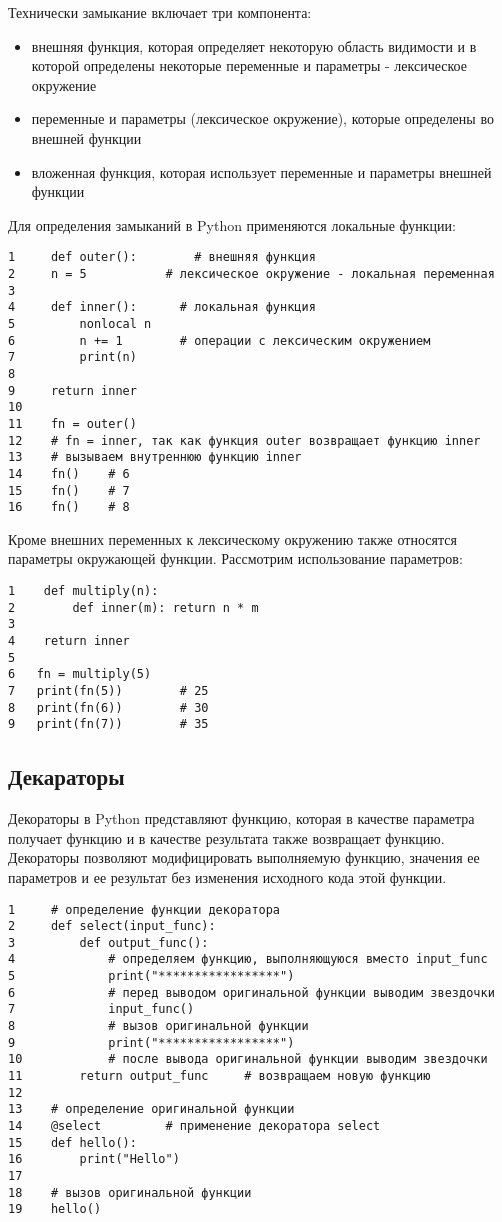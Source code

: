 \documentclass[12pt, a4paper]{article}
\begin{document}
Технически замыкание включает три компонента:

\begin{itemize}
    \item внешняя функция, которая определяет некоторую область видимости и в которой определены некоторые переменные и параметры - лексическое окружение
    \item переменные и параметры (лексическое окружение), которые определены во внешней функции
    \item вложенная функция, которая использует переменные и параметры внешней функции
\end{itemize}

Для определения замыканий в Python применяются локальные функции:

\begin{verbatim}
1     def outer():        # внешняя функция
2     n = 5           # лексическое окружение - локальная переменная
3  
4     def inner():      # локальная функция
5         nonlocal n
6         n += 1        # операции с лексическим окружением
7         print(n)
8  
9     return inner 
10 
11    fn = outer()   
12    # fn = inner, так как функция outer возвращает функцию inner
13    # вызываем внутреннюю функцию inner
14    fn()    # 6
15    fn()    # 7
16    fn()    # 8
\end{verbatim}

Кроме внешних переменных к лексическому окружению также относятся параметры окружающей функции. Рассмотрим использование параметров:

\begin{verbatim}
1    def multiply(n):
2        def inner(m): return n * m
3 
4    return inner
5 
6   fn = multiply(5)
7   print(fn(5))        # 25
8   print(fn(6))        # 30
9   print(fn(7))        # 35
\end{verbatim}

\subsection{Декараторы}

Декораторы в Python представляют функцию, которая в качестве параметра получает функцию и в качестве результата также возвращает функцию. Декораторы позволяют модифицировать выполняемую функцию, значения ее параметров и ее результат без изменения исходного кода этой функции.

\begin{verbatim}
1     # определение функции декоратора
2     def select(input_func):    
3         def output_func():      
4             # определяем функцию, выполняющуюся вместо input_func
5             print("*****************")  
6             # перед выводом оригинальной функции выводим звездочки
7             input_func()                
8             # вызов оригинальной функции
9             print("*****************")  
10            # после вывода оригинальной функции выводим звездочки
11        return output_func     # возвращаем новую функцию
12 
13    # определение оригинальной функции
14    @select         # применение декоратора select
15    def hello():
16        print("Hello")
17 
18    # вызов оригинальной функции
19    hello()
\end{verbatim}
\end{document}

